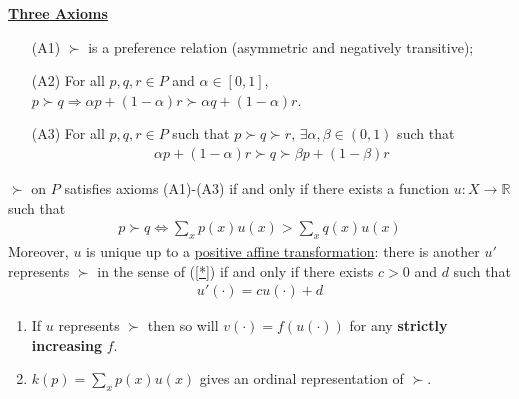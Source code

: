 \documentclass[11pt]{elegantbook}
\begin{document}
\begin{definition}
    \normalfont
    \textbf{\underline{Three Axioms}}
    \begin{enumerate}
        \item[(A1)] $\succ$ is a preference relation (asymmetric and negatively transitive);
        \item[(A2)] For all $p,q,r\in P$ and $\alpha\in[0,1]$, $p\succ q \Rightarrow \alpha p +(1-\alpha)r\succ \alpha q+(1-\alpha)r$.
        \item[(A3)] For all $p,q,r\in P$ such that $p\succ q\succ r$, $\exists \alpha,\beta\in (0,1)$ such that
        \begin{equation}
            \begin{aligned}
                \alpha p +(1-\alpha)r\succ q\succ \beta p +(1-\beta)r
            \end{aligned}
            \nonumber
        \end{equation}
    \end{enumerate}
\end{definition}
\begin{theorem}[vNM]
    $\succ$ on $P$ satisfies axioms (A1)-(A3) if and only if there exists a function $u:X \rightarrow \mathbb{R}$ such that
    \begin{equation}
        \begin{aligned}
            p\succ q \Leftrightarrow \sum_x p(x) u(x)>\sum_x q(x) u(x)
        \end{aligned}
        \tag{*}
        \label{*}
    \end{equation}
    Moreover, $u$ is unique up to a \underline{positive affine transformation}: there is another $u'$ represents $\succ$ in the sense of (\ref{*}) if and only if there exists $c>0$ and $d$ such that
    \begin{equation}
        \begin{aligned}
            u'(\cdot)=cu(\cdot)+d
        \end{aligned}
        \nonumber
    \end{equation}
\end{theorem}
\begin{remark}
    \begin{enumerate}[$\circ$]
        \item If $u$ represents $\succ$ then so will $v(\cdot)=f(u(\cdot))$ for any \textbf{strictly increasing} $f$.
        \item $k(p)=\sum_x p(x)u(x)$ gives an ordinal representation of $\succ$.
    \end{enumerate}
\end{remark}
\end{document}
